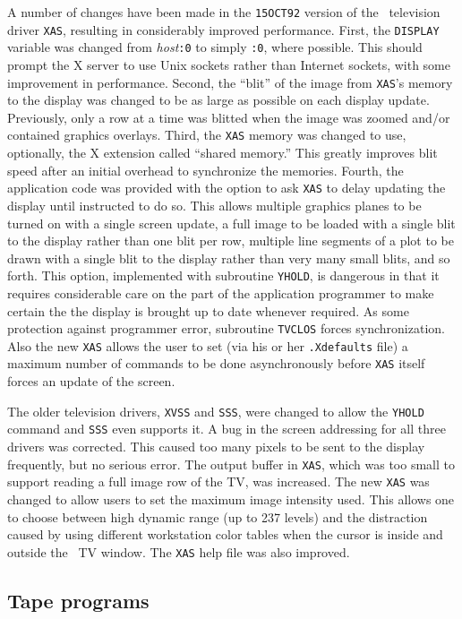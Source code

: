 A number of changes have been made in the {\tt 15OCT92} version of the
\AIPS\ television driver {\tt XAS}, resulting in considerably improved
performance.  First, the {\tt DISPLAY} variable was changed from {\it
host}{\tt :0} to simply {\tt :0}, where possible.  This should prompt
the X server to use Unix sockets rather than Internet sockets, with
some improvement in performance.  Second, the ``blit'' of the image
from {\tt XAS}'s memory to the display was changed to be as large as
possible on each display update.  Previously, only a row at a time was
blitted when the image was zoomed and/or contained graphics overlays.
Third, the {\tt XAS} memory was changed to use, optionally, the X
extension called ``shared memory.''  This greatly improves blit speed
after an initial overhead to synchronize the memories.  Fourth, the
application code was provided with the option to ask {\tt XAS} to
delay updating the display until instructed to do so.  This allows
multiple graphics planes to be turned on with a single screen update,
a full image to be loaded with a single blit to the display rather
than one blit per row, multiple line segments of a plot to be drawn
with a single blit to the display rather than very many small blits,
and so forth.  This option, implemented with subroutine {\tt YHOLD},
is dangerous in that it requires considerable care on the part of the
application programmer to make certain the the display is brought up
to date whenever required.  As some protection against programmer
error, subroutine {\tt TVCLOS} forces synchronization.  Also the new
{\tt XAS} allows the user to set (via his or her {\tt .Xdefaults}
file) a maximum number of commands to be done asynchronously before
{\tt XAS} itself forces an update of the screen.

The older television drivers, {\tt XVSS} and {\tt SSS}, were changed
to allow the {\tt YHOLD} command and {\tt SSS} even supports it.  A
bug in the screen addressing for all three drivers was corrected.
This caused too many pixels to be sent to the display frequently, but
no serious error.  The output buffer in {\tt XAS}, which was too small
to support reading a full image row of the TV, was increased.  The
new {\tt XAS} was changed to allow users to set the maximum image
intensity used.  This allows one to choose between high dynamic range
(up to 237 levels) and the distraction caused by using different
workstation color tables when the cursor is inside and outside the
\AIPS\ TV window.  The {\tt XAS} help file was also improved.

\subsection{Tape programs}

